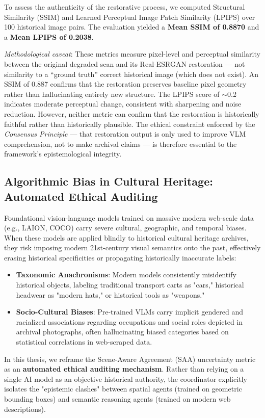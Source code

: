 \documentclass[12pt,onecolumn,a4paper]{IEEEtran}
\begin{document}
To assess the authenticity of the restorative process, we computed Structural Similarity (SSIM) and Learned Perceptual Image Patch Similarity (LPIPS) over 100 historical image pairs. The evaluation yielded a \textbf{Mean SSIM of 0.8870} and a \textbf{Mean LPIPS of 0.2038}.

\textit{Methodological caveat}: These metrics measure pixel-level and perceptual similarity between the original degraded scan and its Real-ESRGAN restoration --- not similarity to a ``ground truth'' correct historical image (which does not exist). An SSIM of 0.887 confirms that the restoration preserves baseline pixel geometry rather than hallucinating entirely new structure. The LPIPS score of $\sim$0.2 indicates moderate perceptual change, consistent with sharpening and noise reduction. However, neither metric can confirm that the restoration is historically faithful rather than historically plausible. The ethical constraint enforced by the \textit{Consensus Principle} --- that restoration output is only used to improve VLM comprehension, not to make archival claims --- is therefore essential to the framework's epistemological integrity.

\subsection{Algorithmic Bias in Cultural Heritage: Automated Ethical Auditing}
Foundational vision-language models trained on massive modern web-scale data (e.g., LAION, COCO) carry severe cultural, geographic, and temporal biases. When these models are applied blindly to historical cultural heritage archives, they risk imposing modern 21st-century visual semantics onto the past, effectively erasing historical specificities or propagating historically inaccurate labels:
\begin{itemize}
    \item \textbf{Taxonomic Anachronisms}: Modern models consistently misidentify historical objects, labeling traditional transport carts as "cars," historical headwear as "modern hats," or historical tools as "weapons."
    \item \textbf{Socio-Cultural Biases}: Pre-trained VLMs carry implicit gendered and racialized associations regarding occupations and social roles depicted in archival photographs, often hallucinating biased categories based on statistical correlations in web-scraped data.
\end{itemize}

In this thesis, we reframe the Scene-Aware Agreement (SAA) uncertainty metric as an \textbf{automated ethical auditing mechanism}. Rather than relying on a single AI model as an objective historical authority, the coordinator explicitly isolates the "epistemic clashes" between spatial agents (trained on geometric bounding boxes) and semantic reasoning agents (trained on modern web descriptions). 
\end{document}
